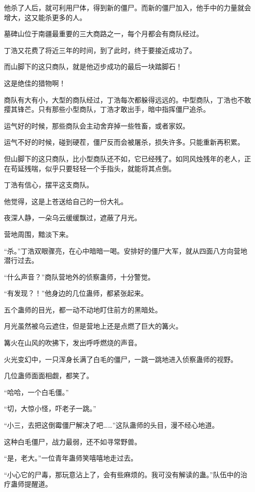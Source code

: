 \begin{this_body}
他杀了人后，就可利用尸体，得到新的僵尸。而新的僵尸加入，他手中的力量就会增大，这又能杀更多的人。

墓碑山位于南疆最重要的三大商路之一，每个月都会有商队经过。

丁浩又花费了将近三年的时间，到了此时，终于要接近成功了。

而山脚下的这只商队，就是他迈步成功的最后一块踏脚石！

这是绝佳的猎物啊！

商队有大有小，大型的商队经过，丁浩每次都躲得远远的。中型商队，丁浩也不敢撄其锋芒。只有那些小型商队，丁浩才敢出手，暗中指挥僵尸追杀。

运气好的时候，那些商队会主动舍弃掉一些牲畜，或者家奴。

运气不好的时候，碰到硬茬，僵尸反而会被屠杀，损失许多。只能重新再积累。

但山脚下的这只商队，比小型商队还不如，它已经残了。如同风烛残年的老人，正在苟延残喘，似乎只要轻轻一个手指头，就能将其点倒。

丁浩有信心，摆平这支商队。

他觉得，这是上苍送给自己的一份大礼。

夜深人静，一朵乌云缓缓飘过，遮蔽了月光。

营地周围，黯淡下来。

“杀。”丁浩双眼骤亮，在心中暗暗一喝。安排好的僵尸大军，就从四面八方向营地潜行过去。

“什么声音？”商队营地外的侦察蛊师，十分警觉。

“有发现？！”他身边的几位蛊师，都紧张起来。

五个蛊师的目光，都一动不动地盯住前方的黑暗处。

月光虽然被乌云遮住，但是营地上还是点燃了巨大的篝火。

篝火在山风的吹拂下，发出呼呼燃烧的声音。

火光变幻中，一只浑身长满了白毛的僵尸，一跳一跳地进入侦察蛊师的视野。

几位蛊师面面相觑，都笑了。

“哈哈，一个白毛僵。”

“切，大惊小怪，吓老子一跳。”

“小三，去把这倒霉僵尸解决了吧……”这队蛊师的头目，漫不经心地道。

这种白毛僵尸，战力最弱，还不如寻常野兽。

“是，老大。”一位青年蛊师笑嘻嘻地走过去。

“小心它的尸毒，那玩意沾上了，会有些麻烦的。我可没有解读的蛊。”队伍中的治疗蛊师提醒道。


\end{this_body}
